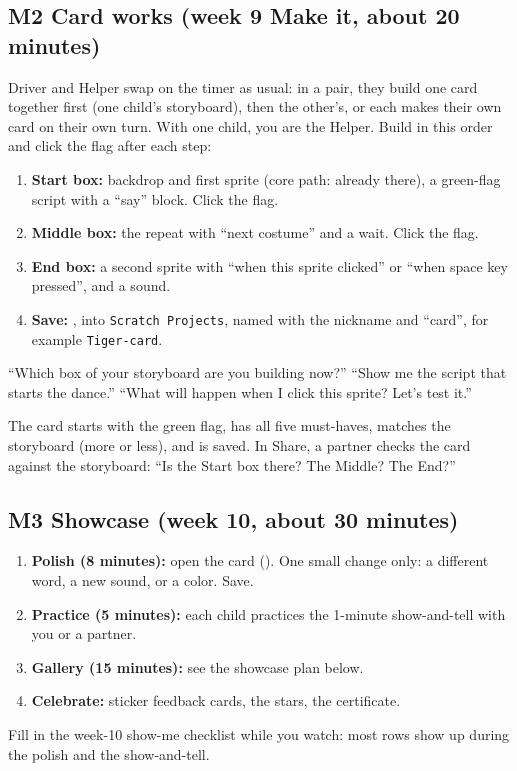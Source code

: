 \documentclass[track=junior,level=1,teacher]{kidscode}
\begin{document}
\subsection{M2 Card works (week 9 Make it, about 20 minutes)}
Driver and Helper swap on the timer as usual: in a pair, they build one card together first (one
child's storyboard), then the other's, or each makes their own card on their own turn. With one child,
you are the Helper. Build in this order and click the flag after each step:
\begin{enumerate}[itemsep=2pt]
  \item \textbf{Start box:} backdrop and first sprite (core path: already there), a green-flag script
        with a \enquote{say} block. Click the flag.
  \item \textbf{Middle box:} the repeat with \enquote{next costume} and a wait. Click the flag.
  \item \textbf{End box:} a second sprite with \enquote{when this sprite clicked} or \enquote{when space key pressed}, and a sound.
  \item \textbf{Save:} , into \texttt{Scratch Projects}, named with
        the nickname and \enquote{card}, for example \texttt{Tiger-card}.
\end{enumerate}
\begin{teacherscript}
\enquote{Which box of your storyboard are you building now?} \enquote{Show me the script that starts
the dance.} \enquote{What will happen when I click this sprite? Let's test it.}
\end{teacherscript}
\begin{formativecheck}
The card starts with the green flag, has all five must-haves, matches the storyboard (more or less),
and is saved. In Share, a partner checks the card against the storyboard: \enquote{Is the Start box there?
The Middle? The End?}
\end{formativecheck}

\subsection{M3 Showcase (week 10, about 30 minutes)}
\begin{enumerate}[itemsep=2pt]
  \item \textbf{Polish (8 minutes):} open the card (). One small
        change only: a different word, a new sound, or a color. Save.
  \item \textbf{Practice (5 minutes):} each child practices the 1-minute show-and-tell with you or a partner.
  \item \textbf{Gallery (15 minutes):} see the showcase plan below.
  \item \textbf{Celebrate:} sticker feedback cards, the stars, the certificate.
\end{enumerate}
Fill in the week-10 show-me checklist while you watch: most rows show up during the polish and the
show-and-tell.
\end{document}
